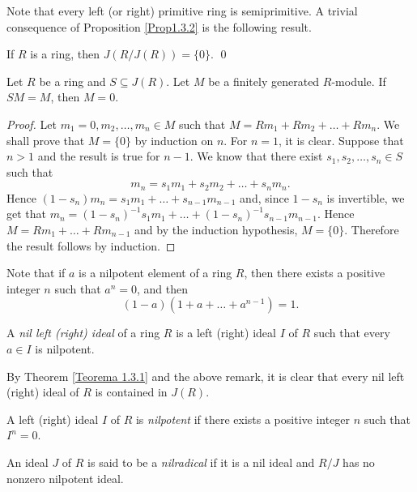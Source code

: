 Note that every left (or right) primitive ring is semiprimitive. A trivial 
consequence of Proposition \ref{Prop1.3.2} is the following result.

\begin{corollary}\label{Cor1.3.3}
    If $R$ is a ring, then $J(R/J(R))=\{0\}$. \qed
\end{corollary}


\begin{proposition}
Let $R$ be a ring and $S\subseteq J(R)$. Let $M$ be a finitely generated $R$-module. If $SM=M$, then $M=0$.
\end{proposition}

\begin{proof}
Let $m_1=0,m_2,\dots,m_n\in M$ such that $M=Rm_1+Rm_2+\dots+Rm_n$.
We shall prove that $M=\{0\}$ by induction on $n$. For $n=1$, it is clear. Suppose that $n>1$ and the result is true for $n-1$. 
We know that there exist $s_1,s_2,\dots,s_n\in S$ such that
$$m_n=s_1m_1+s_2m_2+\dots+s_nm_n.$$
Hence $(1-s_n)m_n=s_1m_1+\dots+s_{n-1}m_{n-1}$ and, since $1-s_n$ is invertible, we get that
$m_n=(1-s_n)^{-1}s_1m_1+\dots+(1-s_n)^{-1}s_{n-1}m_{n-1}$. Hence $M=Rm_1+\dots+Rm_{n-1}$ and by the induction hypothesis, $M=\{0\}$.
Therefore the result follows by induction.
\end{proof}

Note that if $a$ is a nilpotent element of a ring $R$, then there exists a positive integer $n$ such that $a^n=0$, and then
$$(1-a)(1+a+\dots+a^{n-1})=1.$$

\begin{definition}
A \emph{nil left (right) ideal} of a ring $R$ is a left (right) ideal $I$ of $R$ such that every $a\in I$ is nilpotent. 
\end{definition}

By Theorem \ref{Teorema 1.3.1} and the above remark,
it is clear that every nil left (right) ideal of $R$ is contained in $J(R)$.

\begin{definition}
A left (right) ideal $I$ of $R$ is \emph{nilpotent} if there exists a positive integer $n$ 
such that $I^n=0$. 
\end{definition}

\begin{definition}
An ideal $J$ of $R$ is said to be a \emph{nilradical} if it is a nil ideal and $R/J$ has no nonzero nilpotent ideal.
\end{definition}


